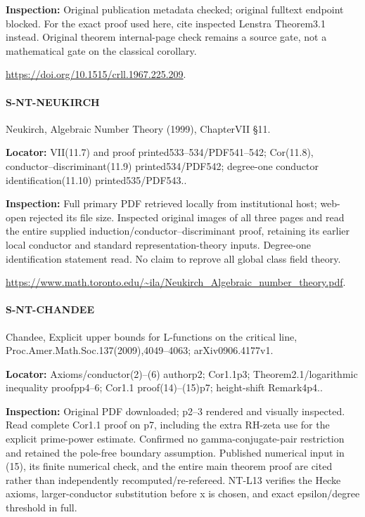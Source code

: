\documentclass[11pt,a4paper]{article}
\begin{document}
\textbf{Inspection:} Original publication metadata checked; original fulltext endpoint blocked.\allowbreak{} For the exact proof used here, cite inspected Lenstra Theorem3.\allowbreak{}1 instead.\allowbreak{} Original theorem internal-page check remains a source gate, not a mathematical gate on the classical corollary.\allowbreak{}

\url{https://doi.org/10.1515/crll.1967.225.209}.

\paragraph{S-NT-NEUKIRCH} Neukirch, Algebraic Number Theory (1999), ChapterVII §11.

\textbf{Locator:} VII(11.\allowbreak{}7) and proof printed533–\allowbreak{}534/\allowbreak{}PDF541–\allowbreak{}542; Cor(11.\allowbreak{}8), conductor–\allowbreak{}discriminant(11.\allowbreak{}9) printed534/\allowbreak{}PDF542; degree-one conductor identification(11.\allowbreak{}10) printed535/\allowbreak{}PDF543.\allowbreak{}.

\textbf{Inspection:} Full primary PDF retrieved locally from institutional host; web-open rejected its file size.\allowbreak{} Inspected original images of all three pages and read the entire supplied induction/\allowbreak{}conductor–\allowbreak{}discriminant proof, retaining its earlier local conductor and standard representation-theory inputs.\allowbreak{} Degree-one identification statement read.\allowbreak{} No claim to reprove all global class field theory.\allowbreak{}

\url{https://www.math.toronto.edu/~ila/Neukirch_Algebraic_number_theory.pdf}.

\paragraph{S-NT-CHANDEE} Chandee, Explicit upper bounds for L-functions on the critical line, Proc.\allowbreak{}Amer.\allowbreak{}Math.\allowbreak{}Soc.\allowbreak{}137(2009),4049–\allowbreak{}4063; arXiv0906.\allowbreak{}4177v1.

\textbf{Locator:} Axioms/\allowbreak{}conductor(2)–\allowbreak{}(6) authorp2; Cor1.\allowbreak{}1p3; Theorem2.\allowbreak{}1/\allowbreak{}logarithmic inequality proofpp4–\allowbreak{}6; Cor1.\allowbreak{}1 proof(14)–\allowbreak{}(15)p7; height-shift Remark4p4.\allowbreak{}.

\textbf{Inspection:} Original PDF downloaded; p2–\allowbreak{}3 rendered and visually inspected.\allowbreak{} Read complete Cor1.\allowbreak{}1 proof on p7, including the extra RH-zeta use for the explicit prime-power estimate.\allowbreak{} Confirmed no gamma-conjugate-pair restriction and retained the pole-free boundary assumption.\allowbreak{} Published numerical input in (15), its finite numerical check, and the entire main theorem proof are cited rather than independently recomputed/\allowbreak{}re-refereed.\allowbreak{} NT-L13 verifies the Hecke axioms, larger-conductor substitution before x is chosen, and exact epsilon/\allowbreak{}degree threshold in full.\allowbreak{}
\end{document}
